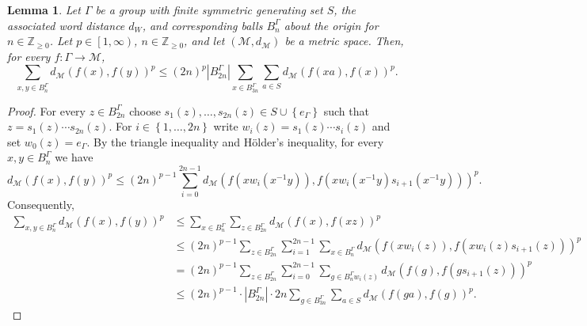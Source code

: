 \documentclass[11pt,reqno]{amsart}
\newtheorem{lemma}[theorem]{Lemma}
\newcommand{\1}{\mathbf 1}
\begin{document}
\begin{lemma}\label{lem:metric bruce} Let $\Gamma$ be a group with finite symmetric generating set $S$, the associated word distance $d_W$, and corresponding balls $B_n^\Gamma$ about the origin for $n\in \mathbb{Z}_{\ge 0}$. Let $p\in \left[1,\infty\right)$, $n\in \mathbb{Z}_{\ge 0}$, and let $\left(\mathcal{M},d_\mathcal{M}\right)$ be a metric space. Then, for every $f:\Gamma\to \mathcal{M}$,
\[
\sum_{x,y\in B^\Gamma_n} d_\mathcal{M}\left(f\left(x\right),f\left(y\right)\right)^p \le \left(2n\right)^{p}\left|B^\Gamma_{2n}\right| \sum_{x\in B^\Gamma_{3n}} \sum_{a\in S}d_\mathcal{M}\left(f\left(xa\right),f\left(x\right)\right)^p.
\]
\end{lemma}
\begin{proof}
For every $z\in B^\Gamma_{2n}$ choose $s_1\left(z\right),\ldots,s_{2n}\left(z\right)\in S\cup \left\{e_\Gamma\right\}$ such that $z=s_1\left(z\right)\cdots s_{2n}\left(z\right)$. For  $i\in \left\{1,\ldots,2n\right\}$ write  $w_i\left(z\right)=s_1\left(z\right)\cdots s_i\left(z\right)$ and set $w_0\left(z\right)=e_\Gamma$. By the triangle inequality and H\"older's inequality, for every $x,y\in B^\Gamma_n$ we have
\begin{equation*}
d_\mathcal{M}\left(f\left(x\right),f\left(y\right)\right)^p\le \left(2n\right)^{p-1}\sum_{i=0}^{2n-1} d_\mathcal{M}\left(f\left(xw_{i}\left(x^{-1}y\right)\right),f\left(xw_{i}\left(x^{-1}y\right)s_{i+1}\left(x^{-1}y\right)\right)\right)^p.
\end{equation*}
Consequently,
\begin{align*}
\sum_{x,y\in B^\Gamma_n} d_\mathcal{M}\left(f\left(x\right),f\left(y\right)\right)^p&\le \sum_{x\in B^\Gamma_n}\sum_{z\in B^\Gamma_{2n}}d_\mathcal{M}\left(f\left(x\right),f\left(xz\right)\right)^p\\
&\le \left(2n\right)^{p-1}\sum_{z\in B^\Gamma_{2n}}\sum_{i=1}^{2n-1}\sum_{x\in B^\Gamma_n}d_\mathcal{M}\left(f\left(xw_{i}\left(z\right)\right),f\left(xw_{i}\left(z\right)s_{i+1}\left(z\right)\right)\right)^p\\
&= \left(2n\right)^{p-1} \sum_{z\in B^\Gamma_{2n}}\sum_{i=0}^{2n-1}\sum_{g\in B^\Gamma_nw_i\left(z\right)} d_\mathcal{M}\left(f\left(g\right),f\left(gs_{i+1}\left(z\right)\right)\right)^p\\
&\le \left(2n\right)^{p-1} \cdot \left|B^\Gamma_{2n}\right|\cdot 2n\sum_{g\in B^\Gamma_{3n}} \sum_{a\in S}d_\mathcal{M}\left(f\left(ga\right),f\left(g\right)\right)^p.
\end{align*}
\end{proof}
\end{document}
